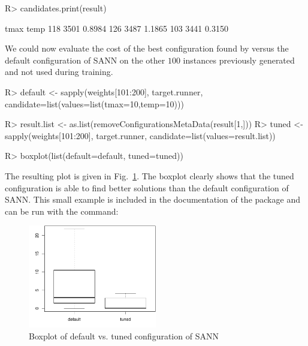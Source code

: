 \documentclass[article,a4paper,nojss,notitle]{jss}
\newcommand{\irace}{\pkg{irace}\xspace}
\begin{document}
\begin{CodeChunk}
\begin{CodeInput}
R> candidates.print(result)
\end{CodeInput}
\begin{CodeOutput}
      tmax   temp
118 3501 0.8984
126 3487 1.1865
103 3441 0.3150
\end{CodeOutput}
\end{CodeChunk}

We could now evaluate the cost of the best configuration found by
\irace versus the default configuration of SANN on the other $100$
instances previously generated and not used during training.

\begin{CodeChunk}
\begin{CodeInput}
R> default <- sapply(weights[101:200], target.runner,
                  candidate=list(values=list(tmax=10,temp=10)))

R> result.list <- as.list(removeConfigurationsMetaData(result[1,]))
R> tuned <- sapply(weights[101:200], target.runner, candidate=list(values=result.list))

R> boxplot(list(default=default, tuned=tuned))
\end{CodeInput}
\end{CodeChunk}      

The resulting plot is given in Fig.~\ref{fig:boxplot_sann}. The
boxplot clearly shows that the tuned configuration is able to find
better solutions than the default configuration of SANN. This small example is included in the documentation of the \irace package and can be run with the command:



\begin{figure}
  \centering
  \includegraphics[width=0.5\textwidth]{boxplot-sann.pdf}
  \caption{Boxplot of default vs. tuned configuration of SANN}
  \label{fig:boxplot_sann}
\end{figure}
\end{document}
